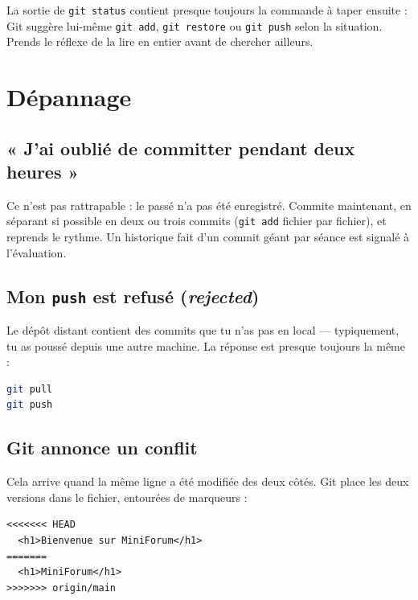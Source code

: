 \documentclass[a4paper,11pt]{article}
\begin{document}
\begin{tcolorbox}[definition, title={\texttt{git status} se lit, il ne se subit pas}]
La sortie de \texttt{git status} contient presque toujours la commande à taper ensuite : Git suggère lui-même \texttt{git add}, \texttt{git restore} ou \texttt{git push} selon la situation. Prends le réflexe de la lire en entier avant de chercher ailleurs.
\end{tcolorbox}

\section{Dépannage}

\subsection{« J'ai oublié de committer pendant deux heures »}

Ce n'est pas rattrapable : le passé n'a pas été enregistré. Commite maintenant, en séparant si possible en deux ou trois commits (\texttt{git add} fichier par fichier), et reprends le rythme. Un historique fait d'un commit géant par séance est signalé à l'évaluation.

\subsection{Mon \texttt{push} est refusé (\textit{rejected})}

Le dépôt distant contient des commits que tu n'as pas en local --- typiquement, tu as poussé depuis une autre machine. La réponse est presque toujours la même :

\begin{lstlisting}[language=bash]
git pull
git push
\end{lstlisting}

\subsection{Git annonce un conflit}

Cela arrive quand la même ligne a été modifiée des deux côtés. Git place les deux versions dans le fichier, entourées de marqueurs :

\begin{lstlisting}
<<<<<<< HEAD
  <h1>Bienvenue sur MiniForum</h1>
=======
  <h1>MiniForum</h1>
>>>>>>> origin/main
\end{lstlisting}
\end{document}
